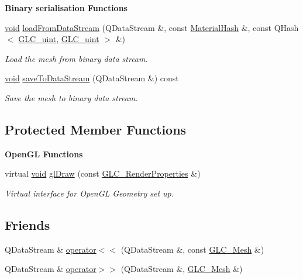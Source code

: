 \begin{Indent}{\bf Binary serialisation Functions}\par
\begin{DoxyCompactItemize}
\item 
\hyperlink{group___u_a_v_objects_plugin_ga444cf2ff3f0ecbe028adce838d373f5c}{void} \hyperlink{class_g_l_c___mesh_af2b554c1a97943805d8f172ade0c1dbb}{load\-From\-Data\-Stream} (Q\-Data\-Stream \&, const \hyperlink{glc__geometry_8h_ae24850fa84cec61db187db5ff78e789d}{Material\-Hash} \&, const Q\-Hash$<$ \hyperlink{glc__global_8h_abf950976fabed69026558df8e2da6c6b}{G\-L\-C\-\_\-uint}, \hyperlink{glc__global_8h_abf950976fabed69026558df8e2da6c6b}{G\-L\-C\-\_\-uint} $>$ \&)
\begin{DoxyCompactList}\small\item\em Load the mesh from binary data stream. \end{DoxyCompactList}\item 
\hyperlink{group___u_a_v_objects_plugin_ga444cf2ff3f0ecbe028adce838d373f5c}{void} \hyperlink{class_g_l_c___mesh_a9f8b12055a66f65bb92cae1c37904cc8}{save\-To\-Data\-Stream} (Q\-Data\-Stream \&) const 
\begin{DoxyCompactList}\small\item\em Save the mesh to binary data stream. \end{DoxyCompactList}\end{DoxyCompactItemize}
\end{Indent}
\subsection*{Protected Member Functions}
\begin{Indent}{\bf Open\-G\-L Functions}\par
\begin{DoxyCompactItemize}
\item 
virtual \hyperlink{group___u_a_v_objects_plugin_ga444cf2ff3f0ecbe028adce838d373f5c}{void} \hyperlink{class_g_l_c___mesh_a97129a9e7f0f18492f762ec4be00533c}{gl\-Draw} (const \hyperlink{class_g_l_c___render_properties}{G\-L\-C\-\_\-\-Render\-Properties} \&)
\begin{DoxyCompactList}\small\item\em Virtual interface for Open\-G\-L Geometry set up. \end{DoxyCompactList}\end{DoxyCompactItemize}
\end{Indent}
\subsection*{Friends}
\begin{DoxyCompactItemize}
\item 
Q\-Data\-Stream \& \hyperlink{class_g_l_c___mesh_adb50a0beb379d8ab0062b7a2e9774bd9}{operator$<$$<$} (Q\-Data\-Stream \&, const \hyperlink{class_g_l_c___mesh}{G\-L\-C\-\_\-\-Mesh} \&)
\item 
Q\-Data\-Stream \& \hyperlink{class_g_l_c___mesh_a9806e430254dca55b06d05a1e68d06d2}{operator$>$$>$} (Q\-Data\-Stream \&, \hyperlink{class_g_l_c___mesh}{G\-L\-C\-\_\-\-Mesh} \&)
\end{DoxyCompactItemize}
